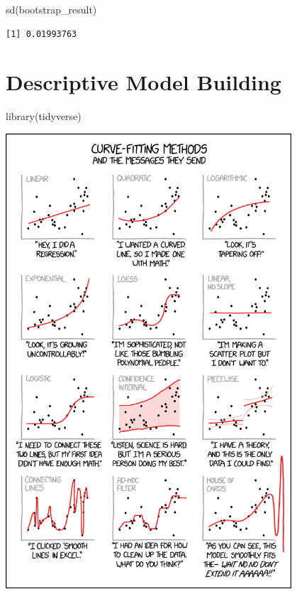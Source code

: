 \documentclass[
  letterpaper,
  DIV=11,
  numbers=noendperiod]{scrreprt}
\newenvironment{Shaded}{\begin{snugshade}}{\end{snugshade}}
\newcommand{\FunctionTok}[1]{\textcolor[rgb]{0.28,0.35,0.67}{#1}}
\newcommand{\NormalTok}[1]{\textcolor[rgb]{0.00,0.23,0.31}{#1}}
\begin{document}
\begin{Shaded}
\begin{Highlighting}[]
\FunctionTok{sd}\NormalTok{(bootstrap\_result)}
\end{Highlighting}
\end{Shaded}

\begin{verbatim}
[1] 0.01993763
\end{verbatim}

\chapter{Descriptive Model Building}\label{descriptive-model-building}

\begin{Shaded}
\begin{Highlighting}[]
\FunctionTok{library}\NormalTok{(tidyverse)}
\end{Highlighting}
\end{Shaded}

\includegraphics[width=0.8\textwidth,height=\textheight]{./images/curve_fitting.png}
\end{document}

